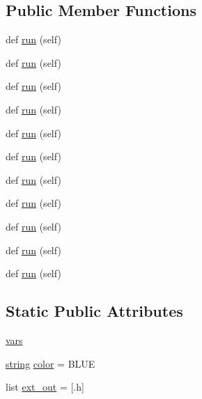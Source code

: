\subsection*{Public Member Functions}
\begin{DoxyCompactItemize}
\item 
def \hyperlink{classwaflib_1_1_tools_1_1glib2_1_1glib__genmarshal_aa3903f3a2c4c26e513378a7b7afd65a5}{run} (self)
\item 
def \hyperlink{classwaflib_1_1_tools_1_1glib2_1_1glib__genmarshal_aa3903f3a2c4c26e513378a7b7afd65a5}{run} (self)
\item 
def \hyperlink{classwaflib_1_1_tools_1_1glib2_1_1glib__genmarshal_aa3903f3a2c4c26e513378a7b7afd65a5}{run} (self)
\item 
def \hyperlink{classwaflib_1_1_tools_1_1glib2_1_1glib__genmarshal_aa3903f3a2c4c26e513378a7b7afd65a5}{run} (self)
\item 
def \hyperlink{classwaflib_1_1_tools_1_1glib2_1_1glib__genmarshal_aa3903f3a2c4c26e513378a7b7afd65a5}{run} (self)
\item 
def \hyperlink{classwaflib_1_1_tools_1_1glib2_1_1glib__genmarshal_aa3903f3a2c4c26e513378a7b7afd65a5}{run} (self)
\item 
def \hyperlink{classwaflib_1_1_tools_1_1glib2_1_1glib__genmarshal_aa3903f3a2c4c26e513378a7b7afd65a5}{run} (self)
\item 
def \hyperlink{classwaflib_1_1_tools_1_1glib2_1_1glib__genmarshal_aa3903f3a2c4c26e513378a7b7afd65a5}{run} (self)
\item 
def \hyperlink{classwaflib_1_1_tools_1_1glib2_1_1glib__genmarshal_aa3903f3a2c4c26e513378a7b7afd65a5}{run} (self)
\item 
def \hyperlink{classwaflib_1_1_tools_1_1glib2_1_1glib__genmarshal_aa3903f3a2c4c26e513378a7b7afd65a5}{run} (self)
\item 
def \hyperlink{classwaflib_1_1_tools_1_1glib2_1_1glib__genmarshal_aa3903f3a2c4c26e513378a7b7afd65a5}{run} (self)
\end{DoxyCompactItemize}
\subsection*{Static Public Attributes}
\begin{DoxyCompactItemize}
\item 
\hyperlink{classwaflib_1_1_tools_1_1glib2_1_1glib__genmarshal_acebb16a781a2c845a5f1d95cd8684210}{vars}
\item 
\hyperlink{test__lib_f_l_a_c_2format_8c_ab02026ad0de9fb6c1b4233deb0a00c75}{string} \hyperlink{classwaflib_1_1_tools_1_1glib2_1_1glib__genmarshal_ad330cf2fa67cec6527579e970865898d}{color} = \textquotesingle{}B\+L\+UE\textquotesingle{}
\item 
list \hyperlink{classwaflib_1_1_tools_1_1glib2_1_1glib__genmarshal_a847f599011447ad71a126af446f60989}{ext\+\_\+out} = \mbox{[}\textquotesingle{}.h\textquotesingle{}\mbox{]}
\end{DoxyCompactItemize}
